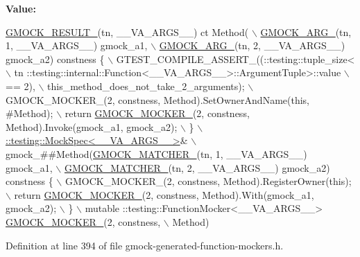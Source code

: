{\bfseries Value\+:}
\begin{DoxyCode}
\hyperlink{gmock-generated-function-mockers_8h_a0e9d94e9c77df84f1103af06feee1077}{GMOCK\_RESULT\_}(tn, \_\_VA\_ARGS\_\_) ct Method( \(\backslash\)
      \hyperlink{gmock-generated-function-mockers_8h_a887575cc1c31158fba808180a10c004f}{GMOCK\_ARG\_}(tn, 1, \_\_VA\_ARGS\_\_) gmock\_a1, \(\backslash\)
      \hyperlink{gmock-generated-function-mockers_8h_a887575cc1c31158fba808180a10c004f}{GMOCK\_ARG\_}(tn, 2, \_\_VA\_ARGS\_\_) gmock\_a2) constness \{ \(\backslash\)
    GTEST\_COMPILE\_ASSERT\_((::testing::tuple\_size<                          \(\backslash\)
        tn ::testing::internal::Function<\_\_VA\_ARGS\_\_>::ArgumentTuple>::value \(\backslash\)
            == 2), \(\backslash\)
        this\_method\_does\_not\_take\_2\_arguments); \(\backslash\)
    GMOCK\_MOCKER\_(2, constness, Method).SetOwnerAndName(\textcolor{keyword}{this}, #Method); \(\backslash\)
    return \hyperlink{gmock-generated-function-mockers_8h_a7d362499e27b1bc3a9806dd3cf58a5b7}{GMOCK\_MOCKER\_}(2, constness, Method).Invoke(gmock\_a1, gmock\_a2); \(\backslash\)
  \} \(\backslash\)
  \hyperlink{classtesting_1_1internal_1_1MockSpec}{::testing::MockSpec<\_\_VA\_ARGS\_\_>}& \(\backslash\)
      gmock\_##Method(\hyperlink{gmock-generated-function-mockers_8h_aa87d0009fe91f1c89d658776b55a769c}{GMOCK\_MATCHER\_}(tn, 1, \_\_VA\_ARGS\_\_) gmock\_a1, \(\backslash\)
                     \hyperlink{gmock-generated-function-mockers_8h_aa87d0009fe91f1c89d658776b55a769c}{GMOCK\_MATCHER\_}(tn, 2, \_\_VA\_ARGS\_\_) gmock\_a2) constness \{ \(\backslash\)
    GMOCK\_MOCKER\_(2, constness, Method).RegisterOwner(\textcolor{keyword}{this}); \(\backslash\)
    return \hyperlink{gmock-generated-function-mockers_8h_a7d362499e27b1bc3a9806dd3cf58a5b7}{GMOCK\_MOCKER\_}(2, constness, Method).With(gmock\_a1, gmock\_a2); \(\backslash\)
  \} \(\backslash\)
  mutable ::testing::FunctionMocker<\_\_VA\_ARGS\_\_> \hyperlink{gmock-generated-function-mockers_8h_a7d362499e27b1bc3a9806dd3cf58a5b7}{GMOCK\_MOCKER\_}(2, constness, \(\backslash\)
      Method)
\end{DoxyCode}


Definition at line 394 of file gmock-\/generated-\/function-\/mockers.\+h.

\mbox{\label{gmock-generated-function-mockers_8h_af7c77ba511c631de02bb8c45a6ed3045}} 
